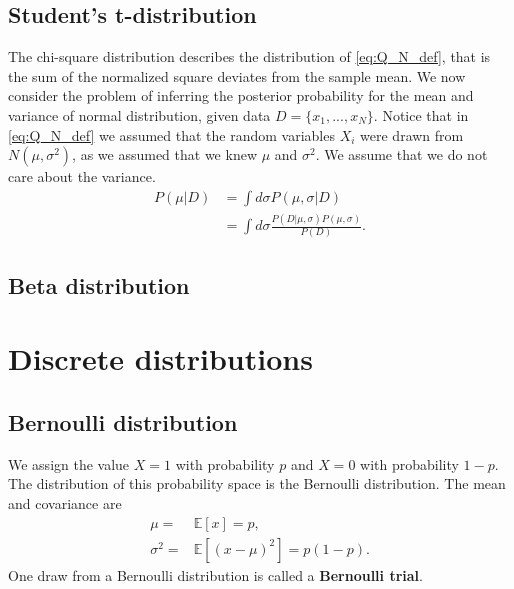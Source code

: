 \subsection{Student's t-distribution}

The chi-square distribution describes the distribution of \eqref{eq:Q_N_def}, that is the sum of the normalized square deviates from the sample mean.
We now consider the problem of inferring the posterior probability for the mean and variance of normal distribution, given data $D=\{x_1,...,x_N\}$. 
Notice that in \eqref{eq:Q_N_def} we assumed that the random variables $X_i$ were drawn from $N\left(\mu,\sigma^2\right)$, as we assumed that we knew $\mu$ and $\sigma^2$. 
We assume that we do not care about the variance. 
\begin{align}
    P\left(\mu|D\right)
    &=
    \int d\sigma P\left(\mu,\sigma|D\right)
    \nonumber\\
    &=
    \int d\sigma \frac{P\left(D|\mu,\sigma\right) P\left(\mu,\sigma\right)}{P\left(D\right)}
    .
\end{align}

\subsection{Beta distribution}


\section{Discrete distributions}
\subsection{Bernoulli distribution}
We assign the value $X=1$ with probability $p$ and $X=0$ with probability $1-p$.
The distribution of this probability space is the Bernoulli distribution.
The mean and covariance are
\begin{align}
    \mu = & \mathbb{E}\left[x\right] = p
    ,\\
    \sigma^2 = & \mathbb{E}\left[\left(x-\mu\right)^2\right] = p\left(1-p\right) 
    .
\end{align}
One draw from a Bernoulli distribution is called a \textbf{Bernoulli trial}. 

